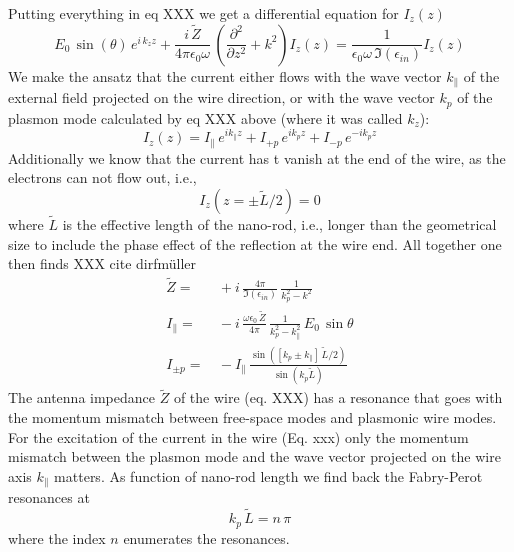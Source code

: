 Putting everything in eq XXX we get a differential equation for $I_z(z)$
\begin{equation}
  E_0 \, \sin ( \theta) \, e^{i \, k_z z} + \frac{i \, \tilde{Z}}{4 \pi  \epsilon_0 \omega} \,   
  \left( \frac{\partial^2}{\partial z^2} + k^2 \right)  I_z(z)
  = \frac{1}{ \epsilon_0 \omega  \, \Im(\epsilon_{in})} I_z(z)
\end{equation}
We make the ansatz that the current either flows with the wave vector $k_\parallel$ of the external field projected on the wire direction, or with the wave vector $k_p$ of the plasmon mode calculated by eq XXX above (where it was called $k_z$):
\begin{equation}
  I_z(z) = I_\parallel \, e^{i k_\parallel z} + I_{+p} \, e^{i k_p z} + I_{-p} \, e^{-i k_p z}
\end{equation}
Additionally we know that the current has t vanish at the end of the wire, as the electrons can not flow out, i.e.,
\begin{equation}
  I_z \left(z = \pm  \tilde{L} / 2  \right) = 0 
\end{equation}
where $\tilde{L}$ is the effective length of the nano-rod, i.e., longer than the geometrical size to include the phase effect of the reflection at the wire end. 
All together one then finds  XXX cite dirfmüller
\begin{align}
  \tilde{Z} = & \, + i \, \frac{4 \pi }{\Im(\epsilon_{in})} \,
  \frac{1 }{  k_p^2 -k^2} \\
  I_\parallel = & \, -i \,  
  \frac{\omega \epsilon_0 \,\tilde{Z}}{4 \pi} \, 
  \frac{1 }{k_p^2 - k_\parallel^2 } \, E_0  \, \sin \theta \\
%
  I_{\pm p} = & \, - I_\parallel \, \frac{\sin ( [ k_p \pm k_\parallel] \,\tilde{L}/2 )}{\sin( k_p \tilde{L})}
\end{align}
The antenna impedance $ \tilde{Z}$ of the wire (eq. XXX) has a resonance that goes with the momentum mismatch between free-space modes and plasmonic wire modes. For the excitation of the current in the wire (Eq. xxx) only the momentum mismatch between the plasmon mode and the wave vector projected on the wire axis $k_\parallel$ matters. As function of nano-rod length we find back the Fabry-Perot resonances at 
\begin{equation}
  k_p \, \tilde{L} = n \, \pi 
\end{equation}
where the index $n$ enumerates the resonances.

